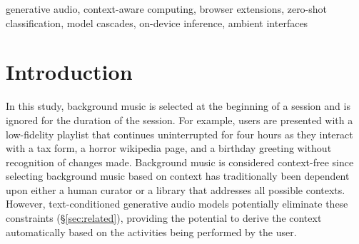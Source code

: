 \documentclass[conference]{IEEEtran}
\begin{document}
\begin{abstract}
Generative audio models can create realistic music from text prompts, but
embedding one in an always-on browser extension brings more problems than just
audio quality: extracting a prompt from a webpage, protecting the user's
browser history, and masking the fact that the model runs slowly. We present
Web2Music and identify where our assumptions fall apart. A page descriptor made
up of four signals adds less than a tenth of a second of latency per page.
Our three-part cascade (keyword, zero-shot NLI, large language
model) barely changes accuracy across its confidence
thresholds and, when the middle stage is hosted, does not significantly reduce
off-device disclosure. Fallback and swap enables the user to hear music before
it is generated, even if some cold requests take too long to time out. In a
corpus of websites, requests, and clips, we document five additional negative
results: crossfade that worsens the seam on a large fraction of clips; lost
clip duration; a sensitive content detector that fails to detect most of an
adversarial set of pages; low agreement between annotators on moods; and an
engineered prompt that loses to a mood word alone on nearly every loop metric. 
\end{abstract}

\begin{IEEEkeywords}
generative audio, context-aware computing, browser extensions, zero-shot
classification, model cascades, on-device inference, ambient interfaces
\end{IEEEkeywords}

\section{Introduction}

In this study, background music is selected at the beginning of a session and
is ignored for the duration of the session. For example, users are presented
with a low-fidelity playlist that continues uninterrupted for four hours as
they interact with a tax form, a horror wikipedia page, and a birthday
greeting without recognition of changes made. Background music is considered
context-free since selecting background music based on context has
traditionally been dependent upon either a human curator or a library that
addresses all possible contexts. However, text-conditioned generative audio
models potentially eliminate these constraints (\S\ref{sec:related}),
providing the potential to derive the context automatically based on the
activities being performed by the user.
\end{document}
